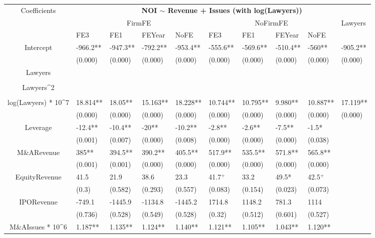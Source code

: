 \documentclass{article}
\begin{document}
\begin{table}[H]
\centering
\begin{tabular}{|clllllllll|}
\hline
\multirow{3}{*}{Coefficients} & \multicolumn{9}{c|}{\textbf{NOI $\sim$ Revenue + Issues (with log(Lawyers))}} \\
\cline{2-10}
& \multicolumn{4}{c}{FirmFE} & \multicolumn{4}{c}{NoFirmFE} & \multirow{2}{*}{Lawyers} \\
\cline{2-9}
& FE3 & FE1 & FEYear & NoFE & FE3 & FE1 & FEYear & NoFE &  \\
\hline
 
Intercept & -966.2** & -947.3** & -792.2** & -953.4** & -555.6** & -569.6** & -510.4** & -560** & -905.2** \\ 
   & (0.000) & (0.000) & (0.000) & (0.000) & (0.000) & (0.000) & (0.000) & (0.000) & (0.000) \\ 
  Lawyers &  &  &  &  &  &  &  &  &  \\ 
   &  &  &  &  &  &  &  &  &  \\ 
  Lawyers^2 &  &  &  &  &  &  &  &  &  \\ 
   &  &  &  &  &  &  &  &  &  \\ 
  log(Lawyers) * 10^7 & 18.814** & 18.05** & 15.163** & 18.228** & 10.744** & 10.795** & 9.980** & 10.887** & 17.119** \\ 
   & (0.000) & (0.000) & (0.000) & (0.000) & (0.000) & (0.000) & (0.000) & (0.000) & (0.000) \\ 
  Leverage & -12.4** & -10.4** & -20** & -10.2** & -2.8** & -2.6** & -7.5** & -1.5* &  \\ 
   & (0.001) & (0.007) & (0.000) & (0.008) & (0.000) & (0.000) & (0.000) & (0.038) &  \\ 
  M\&ARevenue & 385** & 394.5** & 390.2** & 405.5** & 517.9** & 535.5** & 571.8** & 565.8** &  \\ 
   & (0.001) & (0.001) & (0.000) & (0.000) & (0.000) & (0.000) & (0.000) & (0.000) &  \\ 
  EquityRevenue & 41.5 & 21.9 & 38.6 & 23.3 & 41.7$^{+}$ & 33.2 & 49.5* & 42.5$^{+}$ &  \\ 
   & (0.3) & (0.582) & (0.293) & (0.557) & (0.083) & (0.154) & (0.023) & (0.073) &  \\ 
  IPORevenue & -749.1 & -1445.9 & -1134.8 & -1445.2 & 1714.8 & 1148.2 & 781.3 & 1114 &  \\ 
   & (0.736) & (0.528) & (0.549) & (0.528) & (0.32) & (0.512) & (0.601) & (0.527) &  \\ 
  M\&AIssues * 10^6 & 1.187** & 1.135** & 1.124** & 1.140** & 1.121** & 1.105** & 1.043** & 1.120** &  \\ 

\end{tabular}
\end{table}
\end{document}
